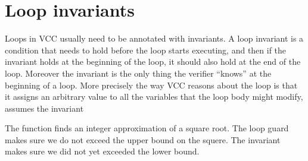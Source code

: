 \section{Loop invariants}

Loops in VCC usually need to be annotated with invariants.
A loop invariant is a condition that needs to hold before
the loop starts executing, and then if the invariant holds
at the beginning of the loop, it should also hold at the
end of the loop.
Moreover the invariant is the only thing the verifier ``knows''
at the beginning of a loop. 
More precisely the way VCC reasons about the loop is that
it assigns an arbitrary value to all the variables that the loop body might modify,
assumes the invariant


\noindent
The  function finds an integer approximation of a square root.
The loop guard makes sure we do not exceed the upper bound on the squere.
The invariant makes sure we did not yet exceeded the lower bound.

